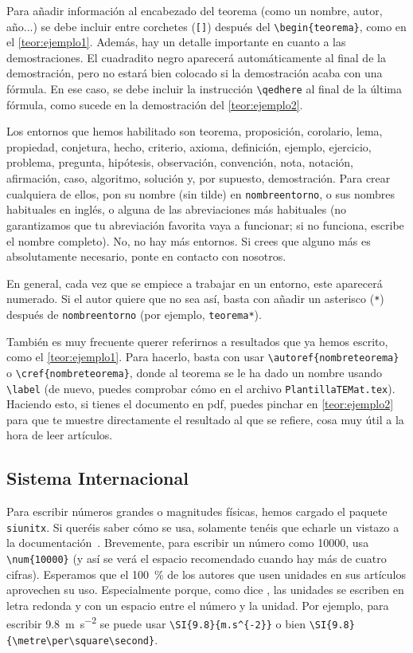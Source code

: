 \documentclass[bibtex]{TEMat-article}
\begin{document}
Para añadir información al encabezado del teorema (como un nombre, autor, año...) se debe incluir entre corchetes (\verb+[]+) después del \verb+\begin{teorema}+, como en el \autoref{teor:ejemplo1}.
Además, hay un detalle importante en cuanto a las demostraciones.
El cuadradito negro aparecerá automáticamente al final de la demostración, pero no estará bien colocado si la demostración acaba con una fórmula.
En ese caso, se debe incluir la instrucción \verb+\qedhere+ al final de la última fórmula, como sucede en la demostración del \autoref{teor:ejemplo2}.

Los entornos que hemos habilitado son teorema, proposición, corolario, lema, propiedad, conjetura, hecho, criterio, axioma, definición, ejemplo, ejercicio, problema, pregunta, hipótesis, observación, convención, nota, notación, afirmación, caso, algoritmo, solución y, por supuesto, demostración.
Para crear cualquiera de ellos, pon su nombre (sin tilde) en \verb+nombreentorno+, o sus nombres habituales en inglés, o alguna de las abreviaciones más habituales (no garantizamos que tu abreviación favorita vaya a funcionar; si no funciona, escribe el nombre completo).
No, no hay más entornos.
Si crees que alguno más es absolutamente necesario, ponte en contacto con nosotros.

En general, cada vez que se empiece a trabajar en un entorno, este aparecerá numerado.
Si el autor quiere que no sea así, basta con añadir un asterisco (\verb+*+) después de \verb+nombreentorno+ (por ejemplo, \verb+teorema*+).

También es muy frecuente querer referirnos a resultados que ya hemos escrito, como el \autoref{teor:ejemplo1}. Para hacerlo, basta con usar \verb+\autoref{nombreteorema}+ o \verb+\cref{nombreteorema}+, donde al teorema se le ha dado un nombre usando \verb+\label+ (de nuevo, puedes comprobar cómo en el archivo \verb+PlantillaTEMat.tex+).
Haciendo esto, si tienes el documento en pdf, puedes pinchar en \autoref{teor:ejemplo2} para que te muestre directamente el resultado al que se refiere, cosa muy útil a la hora de leer artículos.

\subsection{Sistema Internacional}

Para escribir números grandes o magnitudes físicas, hemos cargado el paquete \verb+siunitx+.
Si queréis saber cómo se usa, solamente tenéis que echarle un vistazo a la documentación~\cite{siunitx}.
Brevemente, para escribir un número como \num{10000}, usa \verb+\num{10000}+ (y así se verá el espacio recomendado cuando hay más de cuatro cifras).
Esperamos que el \SI{100}{\percent} de los autores que usen unidades en sus artículos aprovechen su uso.
Especialmente porque, como dice \citet{bezosOM}, las unidades se escriben en letra redonda y con un espacio entre el número y la unidad.
Por ejemplo, para escribir \SI{9.8}{m.s^{-2}} se puede usar \verb+\SI{9.8}{m.s^{-2}}+ o bien \verb+\SI{9.8}{\metre\per\square\second}+.
\end{document}
